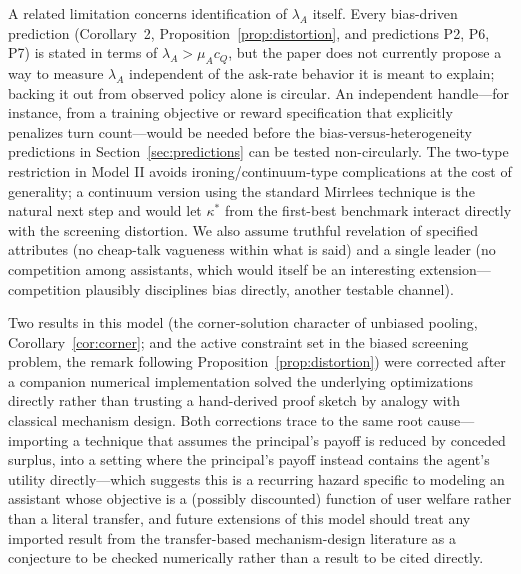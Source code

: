 \documentclass[11pt]{article}
\begin{document}
A related limitation concerns identification of $\lambda_A$ itself. Every
bias-driven prediction (Corollary~2, Proposition~\ref{prop:distortion}, and
predictions P2, P6, P7) is stated in terms of $\lambda_A>\mu_A c_Q$, but the paper
does not currently propose a way to measure $\lambda_A$ independent of the ask-rate
behavior it is meant to explain; backing it out from observed policy alone is
circular. An independent handle---for instance, from a training objective or
reward specification that explicitly penalizes turn count---would be needed
before the bias-versus-heterogeneity predictions in Section~\ref{sec:predictions}
can be tested non-circularly. The two-type restriction in Model II avoids
ironing/continuum-type complications at the cost of generality; a continuum
version using the standard Mirrlees technique is the natural next step and would
let $\kappa^*$ from the first-best benchmark interact directly with the screening
distortion. We also assume truthful revelation of specified attributes (no
cheap-talk vagueness within what is said) and a single leader (no competition
among assistants, which would itself be an interesting extension---competition
plausibly disciplines bias directly, another testable channel).

Two results in this model (the corner-solution character of unbiased pooling,
Corollary~\ref{cor:corner}; and the active constraint set in the biased
screening problem, the remark following Proposition~\ref{prop:distortion}) were
corrected after a companion numerical implementation solved the underlying
optimizations directly rather than trusting a hand-derived proof sketch by
analogy with classical mechanism design. Both corrections trace to the same
root cause---importing a technique that assumes the principal's payoff is
reduced by conceded surplus, into a setting where the principal's payoff
instead contains the agent's utility directly---which suggests this is a
recurring hazard specific to modeling an assistant whose objective is a
(possibly discounted) function of user welfare rather than a literal transfer,
and future extensions of this model should treat any imported result from the
transfer-based mechanism-design literature as a conjecture to be checked
numerically rather than a result to be cited directly.
\end{document}
